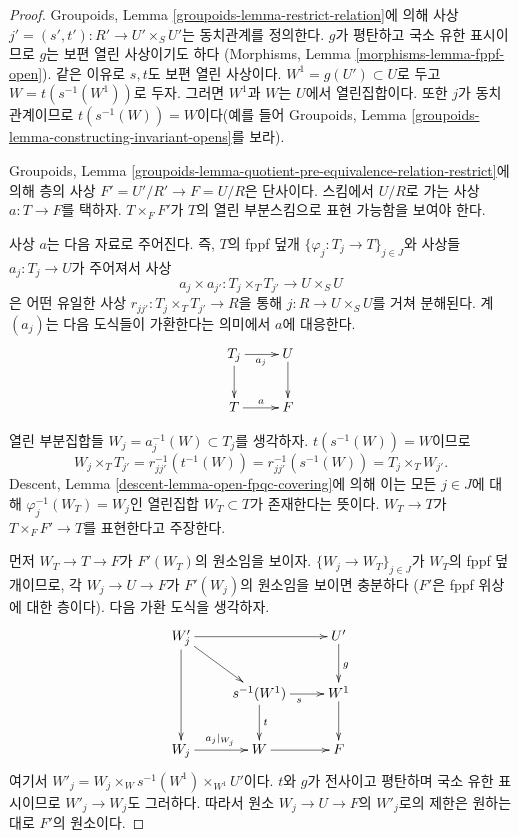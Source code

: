 \begin{proof}
Groupoids, Lemma \ref{groupoids-lemma-restrict-relation}에 의해
사상 $j' = (s', t') : R' \to U' \times_S U'$는 동치관계를 정의한다.
$g$가 평탄하고 국소 유한 표시이므로 $g$는 보편 열린 사상이기도 하다
(Morphisms, Lemma \ref{morphisms-lemma-fppf-open}).
같은 이유로 $s, t$도 보편 열린 사상이다.
$W^1 = g(U') \subset U$로 두고 $W = t(s^{-1}(W^1))$로 두자.
그러면 $W^1$과 $W$는 $U$에서 열린집합이다. 또한 $j$가 동치관계이므로
$t(s^{-1}(W)) = W$이다(예를 들어 Groupoids, Lemma
\ref{groupoids-lemma-constructing-invariant-opens}를 보라).

\medskip\noindent
Groupoids, Lemma
\ref{groupoids-lemma-quotient-pre-equivalence-relation-restrict}에 의해
층의 사상 $F' = U'/R' \to F = U/R$은 단사이다.
스킴에서 $U/R$로 가는 사상 $a : T \to F$를 택하자.
$T \times_F F'$가 $T$의 열린 부분스킴으로 표현 가능함을 보여야 한다.

\medskip\noindent
사상 $a$는 다음 자료로 주어진다. 즉, $T$의 fppf 덮개
$\{\varphi_j : T_j \to T\}_{j \in J}$와 사상들
$a_j : T_j \to U$가 주어져서 사상
$$
a_j \times a_{j'} :
T_j \times_T T_{j'}
\longrightarrow
U \times_S U
$$
은 어떤 유일한 사상 $r_{jj'} : T_j \times_T T_{j'} \to R$을 통해
$j : R \to U \times_S U$를 거쳐 분해된다. 계 $(a_j)$는 다음 도식들이
가환한다는 의미에서 $a$에 대응한다.
$$
\xymatrix{
T_j \ar[r]_{a_j} \ar[d] & U \ar[d] \\
T \ar[r]^a & F
}
$$

\medskip\noindent
열린 부분집합들 $W_j = a_j^{-1}(W) \subset T_j$를 생각하자.
$t(s^{-1}(W)) = W$이므로
$$
W_j \times_T T_{j'} =
r_{jj'}^{-1}(t^{-1}(W)) = r_{jj'}^{-1}(s^{-1}(W)) =
T_j \times_T W_{j'}.
$$
Descent, Lemma \ref{descent-lemma-open-fpqc-covering}에 의해 이는
모든 $j \in J$에 대해 $\varphi_j^{-1}(W_T) = W_j$인 열린집합
$W_T \subset T$가 존재한다는 뜻이다.
$W_T \to T$가 $T \times_F F' \to T$를 표현한다고 주장한다.

\medskip\noindent
먼저 $W_T \to T \to F$가 $F'(W_T)$의 원소임을 보이자.
$\{W_j \to W_T\}_{j \in J}$가 $W_T$의 fppf 덮개이므로, 각
$W_j \to U \to F$가 $F'(W_j)$의 원소임을 보이면 충분하다
($F'$은 fppf 위상에 대한 층이다). 다음 가환 도식을 생각하자.
$$
\xymatrix{
W'_j \ar[rr] \ar[dd] \ar[rd] & & U' \ar[d]^g \\
& s^{-1}(W^1) \ar[r]_s \ar[d]^t & W^1 \ar[d] \\
W_j \ar[r]^{a_j|_{W_j}} & W \ar[r] & F
}
$$
여기서 $W'_j = W_j \times_W s^{-1}(W^1) \times_{W^1} U'$이다.
$t$와 $g$가 전사이고 평탄하며 국소 유한 표시이므로
$W'_j \to W_j$도 그러하다. 따라서 원소 $W_j \to U \to F$의
$W'_j$로의 제한은 원하는 대로 $F'$의 원소이다.


\end{proof}
